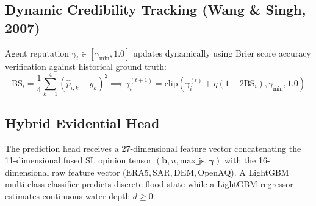 \subsection{Dynamic Credibility Tracking (Wang \& Singh, 2007)}
Agent reputation $\gamma_i \in [\gamma_{\text{min}}, 1.0]$ updates dynamically using Brier score accuracy verification against historical ground truth:
\begin{equation}
\text{BS}_i = \frac{1}{4} \sum_{k=1}^4 (\hat{p}_{i,k} - y_k)^2 \implies \gamma_i^{(t+1)} = \text{clip}\left(\gamma_i^{(t)} + \eta (1 - 2 \text{BS}_i), \gamma_{\text{min}}, 1.0\right)
\end{equation}

\subsection{Hybrid Evidential Head}
The prediction head receives a 27-dimensional feature vector concatenating the 11-dimensional fused SL opinion tensor $(\mathbf{b}, u, \text{max\_js}, \boldsymbol{\gamma})$ with the 16-dimensional raw feature vector ($\text{ERA5}, \text{SAR}, \text{DEM}, \text{OpenAQ}$). A LightGBM multi-class classifier predicts discrete flood state while a LightGBM regressor estimates continuous water depth $d \ge 0$.
